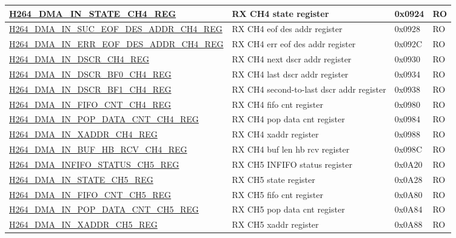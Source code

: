 \begin{longtable}{ | p{7.5cm} | p{5.7cm} | p{1.2cm} | p{1.5cm} | }
\hyperref[regdesc:H264DMAINSTATECH4REG]{H264\_DMA\_IN\_STATE\_CH4\_REG} & RX CH4 state register & 0x0924 & RO \\ \hline
\hyperref[regdesc:H264DMAINSUCEOFDESADDRCH4REG]{H264\_DMA\_IN\_SUC\_EOF\_DES\_ADDR\_CH4\_REG} & RX CH4 eof des addr register & 0x0928 & RO \\ \hline
\hyperref[regdesc:H264DMAINERREOFDESADDRCH4REG]{H264\_DMA\_IN\_ERR\_EOF\_DES\_ADDR\_CH4\_REG} & RX CH4 err eof des addr register & 0x092C & RO \\ \hline
\hyperref[regdesc:H264DMAINDSCRCH4REG]{H264\_DMA\_IN\_DSCR\_CH4\_REG} & RX CH4 next dscr addr register & 0x0930 & RO \\ \hline
\hyperref[regdesc:H264DMAINDSCRBF0CH4REG]{H264\_DMA\_IN\_DSCR\_BF0\_CH4\_REG} & RX CH4 last dscr addr register & 0x0934 & RO \\ \hline
\hyperref[regdesc:H264DMAINDSCRBF1CH4REG]{H264\_DMA\_IN\_DSCR\_BF1\_CH4\_REG} & RX CH4 second-to-last dscr addr register & 0x0938 & RO \\ \hline
\hyperref[regdesc:H264DMAINFIFOCNTCH4REG]{H264\_DMA\_IN\_FIFO\_CNT\_CH4\_REG} & RX CH4 fifo cnt register & 0x0980 & RO \\ \hline
\hyperref[regdesc:H264DMAINPOPDATACNTCH4REG]{H264\_DMA\_IN\_POP\_DATA\_CNT\_CH4\_REG} & RX CH4 pop data cnt register & 0x0984 & RO \\ \hline
\hyperref[regdesc:H264DMAINXADDRCH4REG]{H264\_DMA\_IN\_XADDR\_CH4\_REG} & RX CH4 xaddr register & 0x0988 & RO \\ \hline
\hyperref[regdesc:H264DMAINBUFHBRCVCH4REG]{H264\_DMA\_IN\_BUF\_HB\_RCV\_CH4\_REG} & RX CH4 buf len hb rcv register & 0x098C & RO \\ \hline
\hyperref[regdesc:H264DMAINFIFOSTATUSCH5REG]{H264\_DMA\_INFIFO\_STATUS\_CH5\_REG} & RX CH5 INFIFO status register & 0x0A20 & RO \\ \hline
\hyperref[regdesc:H264DMAINSTATECH5REG]{H264\_DMA\_IN\_STATE\_CH5\_REG} & RX CH5 state register & 0x0A28 & RO \\ \hline
\hyperref[regdesc:H264DMAINFIFOCNTCH5REG]{H264\_DMA\_IN\_FIFO\_CNT\_CH5\_REG} & RX CH5 fifo cnt register & 0x0A80 & RO \\ \hline
\hyperref[regdesc:H264DMAINPOPDATACNTCH5REG]{H264\_DMA\_IN\_POP\_DATA\_CNT\_CH5\_REG} & RX CH5 pop data cnt register & 0x0A84 & RO \\ \hline
\hyperref[regdesc:H264DMAINXADDRCH5REG]{H264\_DMA\_IN\_XADDR\_CH5\_REG} & RX CH5 xaddr register & 0x0A88 & RO \\ \hline

\end{longtable}
